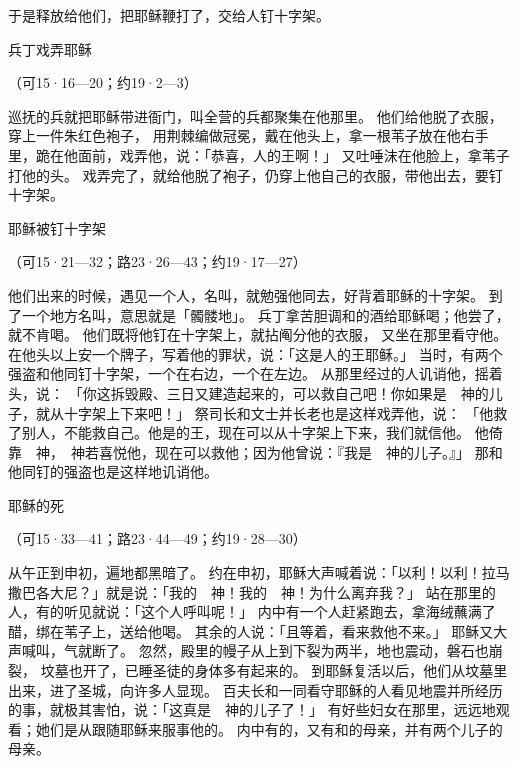 {于是{}释放{}给他们，把耶稣鞭打了，交给人钉十字架。
\par }{\SH 兵丁戏弄耶稣
\par }{\R （可15·16—20；约19·2—3）
\par }{\PP {}巡抚的兵就把耶稣带进衙门，叫全营的兵都聚集在他那里。
他们给他脱了衣服，穿上一件朱红色袍子，
用荆棘编做冠冕，戴在他头上，拿一根苇子放在他右手里，跪在他面前，戏弄他，说：「恭喜，{}人的王啊！」
又吐唾沫在他脸上，拿苇子打他的头。
戏弄完了，就给他脱了袍子，仍穿上他自己的衣服，带他出去，要钉十字架。
\par }{\SH 耶稣被钉十字架
\par }{\R （可15·21—32；路23·26—43；约19·17—27）
\par }{\PP {}他们出来的时候，遇见一个{}人，名叫{}，就勉强他同去，好背着耶稣的十字架。
到了一个地方名叫{}，意思就是「髑髅地」。
兵丁拿苦胆调和的酒给耶稣喝；他尝了，就不肯喝。
他们既将他钉在十字架上，就拈阄分他的衣服，
又坐在那里看守他。
在他头以上安一个牌子，写着他的罪状，说：「这是{}人的王耶稣。」
当时，有两个强盗和他同钉十字架，一个在右边，一个在左边。
从那里经过的人讥诮他，摇着头，说：
「你这拆毁{}殿、三日又建造起来的，可以救自己吧！你如果是　神的儿子，就从十字架上下来吧！」
祭司长和文士并长老也是这样戏弄他，说：
「他救了别人，不能救自己。他是{}的王，现在可以从十字架上下来，我们就信他。
他倚靠　神，　神若喜悦他，现在可以救他；因为他曾说：『我是　神的儿子。』」
那和他同钉的强盗也是这样地讥诮他。
\par }{\SH 耶稣的死
\par }{\R （可15·33—41；路23·44—49；约19·28—30）
\par }{\PP {}从午正到申初，遍地都黑暗了。
约在申初，耶稣大声喊着说：「以利！以利！拉马撒巴各大尼？」就是说：「我的　神！我的　神！为什么离弃我？」
站在那里的人，有的听见就说：「这个人呼叫{}呢！」
内中有一个人赶紧跑去，拿海绒蘸满了醋，绑在苇子上，送给他喝。
其余的人说：「且等着，看{}来救他不来。」
耶稣又大声喊叫，气就断了。
忽然，殿里的幔子从上到下裂为两半，地也震动，磐石也崩裂，
坟墓也开了，已睡圣徒的身体多有起来的。
到耶稣复活以后，他们从坟墓里出来，进了圣城，向许多人显现。
百夫长和一同看守耶稣的人看见地震并所经历的事，就极其害怕，说：「这真是　神的儿子了！」
有好些妇女在那里，远远地观看；她们是从{}跟随耶稣来服事他的。
内中有{}的{}，又有{}和{}的母亲{}，并有{}两个儿子的母亲。
}
